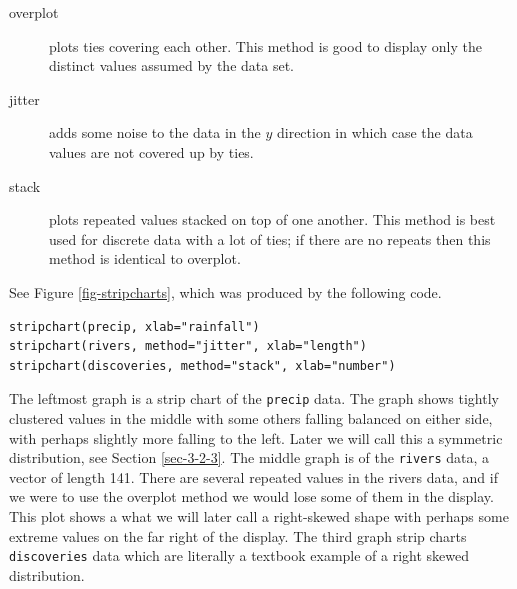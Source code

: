 \documentclass[captions=tableheading]{scrbook}
\begin{document}
\begin{description}
\item[overplot] plots ties covering each other. This method is good to display only the distinct values assumed by the data set.
\item[jitter] adds some noise to the data in the \(y\) direction in which case the data values are not covered up by ties.
\item[stack] plots repeated values stacked on top of one another. This method is best used for discrete data with a lot of ties; if there are no repeats then this method is identical to overplot.
\end{description}

See Figure \ref{fig-stripcharts}, which was produced by the following code.


\lstset{language=R}
\begin{lstlisting}
stripchart(precip, xlab="rainfall")
stripchart(rivers, method="jitter", xlab="length")
stripchart(discoveries, method="stack", xlab="number")
\end{lstlisting}

The leftmost graph is a strip chart of the \texttt{precip} data. The graph shows tightly clustered values in the middle with some others falling balanced on either side, with perhaps slightly more falling to the left. Later we will call this a symmetric distribution, see Section \ref{sec-3-2-3}. The middle graph is of the \texttt{rivers} data, a vector of length 141. There are several repeated values in the rivers data, and if we were to use the overplot method we would lose some of them in the display. This plot shows a what we will later call a right-skewed shape with perhaps some extreme values on the far right of the display. The third graph strip charts \texttt{discoveries} data which are literally a textbook example of a right skewed distribution.
\end{document}
